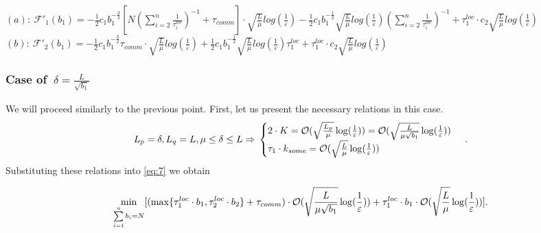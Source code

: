 \documentclass{article}
\begin{document}
$(a): ~\mathcal{F'}_1(b_1) = -\frac{1}{2}c_1 b_1^{-\frac{3}{2}}  [N (\sum\limits_{i = 2}^{n} \frac{1}{\tau_i^{loc}})^{-1} + \tau_{comm}]\cdot 
\sqrt{\frac{L}{\mu}}log (\frac{1}{\varepsilon})  - 
\frac{1}{2} c_1 b_1^{-\frac{1}{2}}   \sqrt{\frac{L}{\mu}}log (\frac{1}{\varepsilon})(\sum\limits_{i = 2}^{n} \frac{1}{\tau_i^{loc}})^{-1} +
\tau_1^{loc}\cdot c_2  \sqrt{\frac{L}{\mu}}log (\frac{1}{\varepsilon})$ \\
$(b): ~\mathcal{F'}_2(b_1) = -\frac{1}{2}c_1 b_1^{-\frac{3}{2}} \tau_{comm}\cdot \sqrt{\frac{L}{\mu}}log (\frac{1}{\varepsilon}) + \frac{1}{2} c_1 b_1^{-\frac{1}{2}}  \sqrt{\frac{L}{\mu}}log (\frac{1}{\varepsilon})\tau_1^{loc}   + \tau_1^{loc}\cdot c_2  \sqrt{\frac{L}{\mu}}log (\frac{1}{\varepsilon})$\\


\subsubsection{Case of $~\delta = \frac{L}{\sqrt{b_1}}$}
We will proceed similarly to the previous point. First, let us present the necessary relations in this case.
\begin{equation}
    \notag
    L_p = \delta, L_q = L, \mu \leq \delta \leq L \Rightarrow 
    \\
    \notag
    \begin{cases}
      2\cdot K = \mathcal O(\sqrt{\frac{L_p}{\mu}}\log(\frac{1}{\varepsilon}))  = \mathcal O(\sqrt{\frac{L}{\mu \sqrt{b_1}}}\log(\frac{1}{\varepsilon}))\\
      \tau_1\cdot k_{some} = \mathcal O(\sqrt{\frac{L}{\mu}}\log(\frac{1}{\varepsilon}))
    \end{cases}\,.
\end{equation}
Substituting these relations into \eqref{eq:7} we obtain

\begin{equation}
    \notag
    \underset{\sum\limits_{i = 1}^{n} b_i = N}{\min}[(\max\{\tau_1^{loc}\cdot b_1, \tau_2^{loc}\cdot b_2\} + \tau_{comm}) \cdot \mathcal O(\sqrt{\frac{L}{\mu \sqrt{b_1}}}\log(\frac{1}{\varepsilon})) + \tau_1^{loc}\cdot b_1 \cdot \mathcal O(\sqrt{\frac{L}{\mu}}\log(\frac{1}{\varepsilon}))].
\end{equation}
\end{document}
